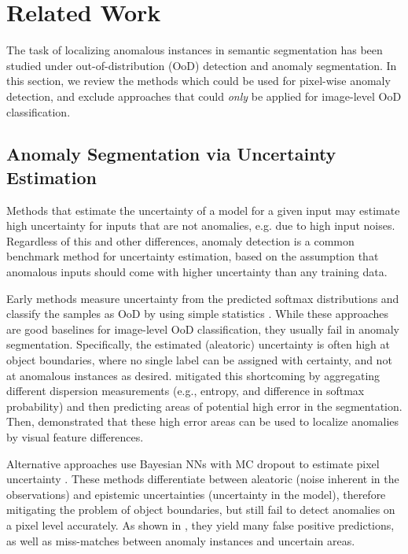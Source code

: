 \documentclass[final]{cvpr}
\begin{document}
%
 \section{Related Work}









The task of localizing anomalous instances in semantic segmentation has been studied under out-of-distribution (OoD) detection and anomaly segmentation. In this section, we review the methods which could be used for pixel-wise anomaly detection, and exclude approaches that could \textit{only} be applied for image-level OoD classification. 

\subsection{Anomaly Segmentation via Uncertainty Estimation}
Methods that estimate the uncertainty of a model for a given input may estimate high uncertainty for inputs that are not anomalies, e.g. due to high input noises. Regardless of this and other differences, anomaly detection is a common benchmark method for uncertainty estimation, based on the assumption that anomalous inputs should come with higher uncertainty than any training data.

Early methods measure uncertainty from the predicted softmax distributions and classify the samples as OoD by using simple statistics \cite{MSP, calibrated_confidence, odin}. While these approaches are good baselines for image-level OoD classification, they usually fail in anomaly segmentation. Specifically, the estimated (aleatoric) uncertainty is often high at object boundaries, where no single label can be assigned with certainty, and not at anomalous instances as desired. \cite{meta} mitigated this shortcoming by aggregating different dispersion measurements (e.g., entropy, and difference in softmax probability) and then predicting areas of potential high error in the segmentation. Then, \cite{meta_ood} demonstrated that these high error areas can be used to localize anomalies by visual feature differences. 


Alternative approaches use Bayesian NNs with MC dropout to estimate pixel uncertainty \cite{bayes_uncertainty, bayes_deep, bayes_ensemble}. 
These methods differentiate between aleatoric (noise inherent in the observations) and epistemic uncertainties (uncertainty in the model),
therefore mitigating the problem of object boundaries, but still fail to detect anomalies on a pixel level accurately. As shown in \cite{epfl}, they yield many false positive predictions, as well as miss-matches between anomaly instances and uncertain areas. 
\end{document}
